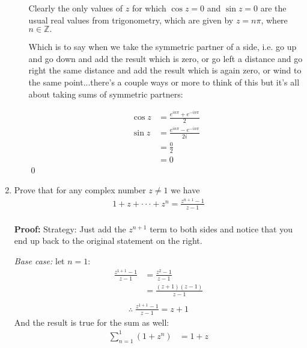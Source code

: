 \begin{enumerate}
\begin{enumerate}
		            Clearly the only values of $z$ for which $\cos{z}=0$ and $\sin{z}=0$ are the usual real values from
		            trigonometry, which are
		            given by $z=n\pi$, where $n \in \mathbb{Z}.$

		            Which is to say when we take the symmetric partner of a side, i.e. go up and go down
		            and add the result which is zero, or go left a distance and go right the same distance and add the
		            result which is again zero, or wind to the same point...there's a couple ways or more to think
		            of this but it's all about taking sums of symmetric partners:

		            \begin{align*}
			            \cos{z} & = \frac{e^{in \pi} + e^{-in \pi}}{2}  \\
			            \sin{z} & = \frac{e^{in \pi} - e^{-in \pi}}{2i} \\
			                    & = \frac{0}{2}                         \\
			                    & = 0
		            \end{align*}
		            \qed
	      \end{enumerate}

	\item Prove that for any complex number $z \neq 1$ we have
	      \begin{align*}
		      1 + z + \cdot\cdot\cdot + z^n = \frac{z^{n + 1} - 1}{z - 1} \\
	      \end{align*}

	      \textbf{Proof:}
	      Strategy: Just add the $z^{n + 1}$ term to both sides and notice that you end
	      up back to the original statement on the right.

	      \emph{Base case:} let $n = 1$:
	      \begin{align*}
		      \frac{z^{1 + 1} - 1}{z -1} & = \frac{z^2 - 1}{z - 1}        \\
		                                 & = \frac{(z + 1)(z - 1)}{z - 1} \\
	      \end{align*}
	      \begin{align}
		      \therefore \; \frac{z^{1 + 1} - 1}{z -1} = z + 1
	      \end{align}
	      And the result is true for the sum as well:
	      \begin{align}
		      \sum_{n = 1}^{1} (1 + z^n) & = 1 + z
	      \end{align}


\end{enumerate}
